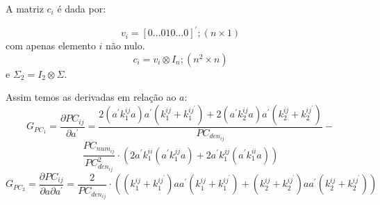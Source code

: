 \documentclass[a4paper,10pt]{article}
\begin{document}
A matriz $c_i$ é dada por:

\begin{equation}
v_{i} = [0 \dots 0 1 0 \dots 0]^{'}; (n \times 1)
\end{equation}
com apenas elemento $i$ não nulo.
\begin{equation}
c_{i} = v_{i} \otimes I_{n}; (n^{2} \times n)
\end{equation}
e $\Sigma_{2} = I_{2} \otimes \Sigma$.

Assim temos as derivadas em relação ao $a$:
\begin{equation}
G_{PC_1} = \frac{\partial PC_{ij}}{\partial a^{'}} = \frac{2 (a^{'} k_{1}^{ij} a) a^{'} (k_{1}^{ij} + k_{1}^{ij^{'}}) + 2 (a^{'} k_{2}^{ij} a) a^{'} (k_{2}^{ij} + k_{2}^{ij^{'}}) } 
{PC_{den_{ij}}} - 
\end{equation}
\begin{equation}
\frac{PC_{num_{ij}}}{PC_{den_{ij}}^{2}} \cdot (2 a^{'} k_{1}^{ii} (a^{'} k_{1}^{jj} a) + 2 a^{'} k_{1}^{jj} ( a^{'} k_{1}^{ii} a))
\end{equation}
\begin{equation}
G_{PC_2} = \frac{\partial PC_{ij}}{\partial a \partial a^{'}} = \frac{2}{PC_{den_{ij}}} \cdot ((k_{1}^{ij} + k_{1}^{ij^{'}}) a a^{'} (k_{1}^{ij} + k_{1}^{ij^{'}}) + (k_{2}^{ij} + k_{2}^{ij^{'}}) a a^{'} (k_{2}^{ij} + k_{2}^{ij^{'}}))
\end{equation}
\end{document}
